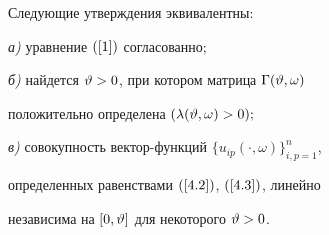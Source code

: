 \begin{thm}


\label{th4.1}


Следующие утверждения эквивалентны$:$





{\em а)} уравнение $(\ref{1})$ согласованно$;$





{\em б)} найдется $\vartheta>0$, при котором матрица $\Gamma(\vartheta,\omega)$


положительно определена $(\lambda(\vartheta,\omega)>0);$





{\em в)} совокупность вектор-функций $\{u_{ip}(\cdot,\omega)\}_{i,p=1}^n$,


определенных равенствами $(\ref{4.2})$, $(\ref{4.3})$, линейно


независима на $[0,\vartheta]$ для некоторого $\vartheta>0$.


\end{thm}





